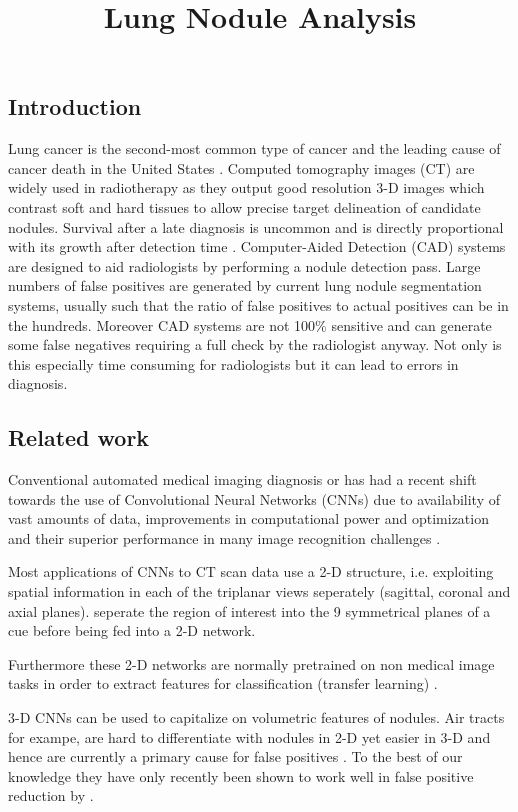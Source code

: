 \documentclass{article}%
\begin{document}
\title{Lung Nodule Analysis}
\maketitles

\subsection{Introduction}

Lung cancer is the second-most common type of cancer and the leading cause of cancer death in the United States \cite{acs}. Computed tomography images (CT) are widely used in radiotherapy as they output good resolution 3-D images which contrast soft and hard tissues to allow precise target delineation of candidate nodules. Survival after a late diagnosis is uncommon and is directly proportional with its growth after detection time \cite{dimililer2017tumor}. Computer-Aided Detection (CAD) systems are designed to aid radiologists by  performing a nodule detection pass. Large numbers of false positives are generated by current lung nodule segmentation systems, usually such that the ratio of false positives to actual positives can be in the hundreds. Moreover CAD systems are not 100\% sensitive and can generate some false negatives requiring a full check by the radiologist anyway. Not only is this especially time consuming for radiologists but it can lead to errors in diagnosis. 

\subsection{Related work}


Conventional automated medical imaging diagnosis or  has had a recent shift towards the use of Convolutional Neural Networks (CNNs) \cite{bush2016lung, ramaswamypulmonary, shin2016deep} due to availability of vast amounts of data, improvements in computational power and optimization and their superior performance in many image recognition challenges \cite{2015imagenet,simonyan2014very,taigman2014deepface}.

Most applications of CNNs to CT scan data use a 2-D structure, i.e. exploiting spatial information in each of the triplanar views seperately (sagittal, coronal and axial planes). \cite{setio2015automatic} seperate the region of interest into the 9 symmetrical planes of a cue before being fed into a 2-D network. 

Furthermore these 2-D networks are normally pretrained on non medical image tasks in order to extract features for classification (transfer learning) \cite{ramaswamypulmonary}.

3-D CNNs can be used to capitalize on volumetric features of nodules. Air tracts for exampe, are hard to differentiate with nodules in 2-D yet easier in 3-D and hence are currently a primary cause for false positives \cite{anirudh2016lung}. To the best of our knowledge they have only recently been shown to work well in false positive reduction by \cite{dou2016multi}.
\end{document}
